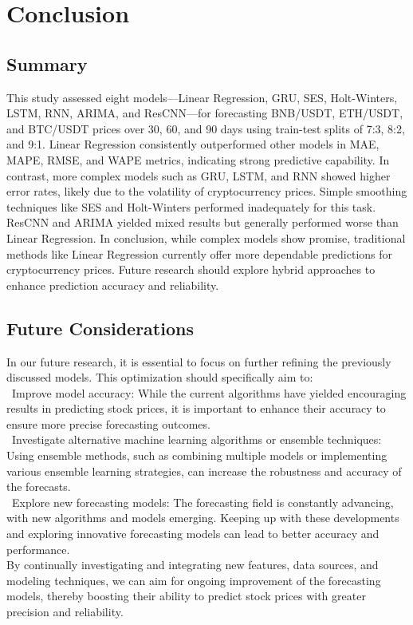 \documentclass{ieeeojies}
\begin{document}
\section{Conclusion}
\subsection{Summary}
This study assessed eight models—Linear Regression, GRU, SES, Holt-Winters, LSTM, RNN, ARIMA, and ResCNN—for forecasting BNB/USDT, ETH/USDT, and BTC/USDT prices over 30, 60, and 90 days using train-test splits of 7:3, 8:2, and 9:1. Linear Regression consistently outperformed other models in MAE, MAPE, RMSE, and WAPE metrics, indicating strong predictive capability. In contrast, more complex models such as GRU, LSTM, and RNN showed higher error rates, likely due to the volatility of cryptocurrency prices. Simple smoothing techniques like SES and Holt-Winters performed inadequately for this task. ResCNN and ARIMA yielded mixed results but generally performed worse than Linear Regression. In conclusion, while complex models show promise, traditional methods like Linear Regression currently offer more dependable predictions for cryptocurrency prices. Future research should explore hybrid approaches to enhance prediction accuracy and reliability.\\

\subsection{Future Considerations}
In our future research, it is essential to focus on further refining the previously discussed models. This optimization should specifically aim to:\\
\indent\textbullet\ Improve model accuracy: While the current algorithms have yielded encouraging results in predicting stock prices, it is important to enhance their accuracy to ensure more precise forecasting outcomes.\\
\indent\textbullet\ Investigate alternative machine learning algorithms or ensemble techniques: Using ensemble methods, such as combining multiple models or implementing various ensemble learning strategies, can increase the robustness and accuracy of the forecasts.\\
\indent\textbullet\ Explore new forecasting models: The forecasting field is constantly advancing, with new algorithms and models emerging. Keeping up with these developments and exploring innovative forecasting models can lead to better accuracy and performance.\\
By continually investigating and integrating new features, data sources, and modeling techniques, we can aim for ongoing improvement of the forecasting models, thereby boosting their ability to predict stock prices with greater precision and reliability.
\end{document}
